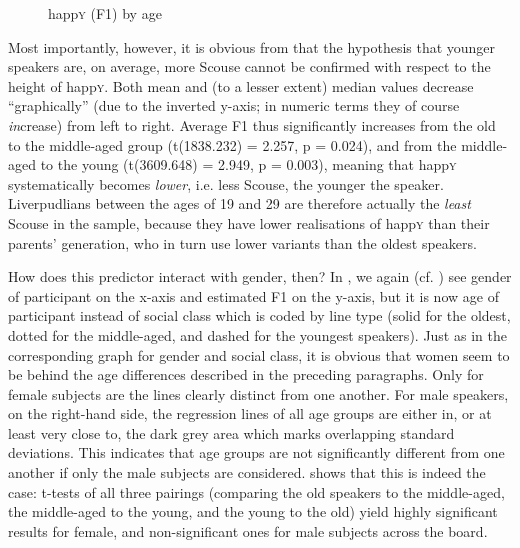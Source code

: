 \begin{figure}
	
		\resizebox{0.5\linewidth}{!}{} 
	\caption{happ\textsc{y} (F1) by age}
	\label{fig.box.f1w.happy.tot}
\end{figure}

Most importantly, however, it is obvious from  that the hypothesis that younger speakers are, on average, more Scouse cannot be confirmed with respect to the height of happ\textsc{y}.
Both mean and (to a lesser extent) median values decrease ``graphically'' (due to the inverted y-axis; in numeric terms they of course \emph{in}crease) from left to right.
Average F1 thus significantly increases from the old to the middle-aged group (t(1838.232) = 2.257, p = 0.024), and from the middle-aged to the young (t(3609.648) = 2.949, p = 0.003), meaning that happ\textsc{y} systematically becomes \emph{lower}, i.e. less Scouse, the younger the speaker.
Liverpudlians between the ages of 19 and 29 are therefore actually the \emph{least} Scouse in the sample, because they have lower realisations of happ\textsc{y} than their parents' generation, who in turn use lower variants than the oldest speakers.

How does this predictor interact with gender, then?
In , we again (cf. ) see gender of participant on the x-axis and estimated F1 on the y-axis, but it is now age of participant instead of social class which is coded by line type (solid for the oldest, dotted for the middle-aged, and dashed for the youngest speakers).
Just as in the corresponding graph for gender and social class, it is obvious that women seem to be behind the age differences described in the preceding paragraphs.
Only for female subjects are the lines clearly distinct from one another.
For male speakers, on the right-hand side, the regression lines of all age groups are either in, or at least very close to, the dark grey area which marks overlapping standard deviations.
This indicates that age groups are not significantly different from one another if only the male subjects are considered.
 shows that this is indeed the case: t-tests of all three pairings (comparing the old speakers to the middle-aged, the middle-aged to the young, and the young to the old) yield highly significant results for female, and non-significant ones for male subjects across the board.

